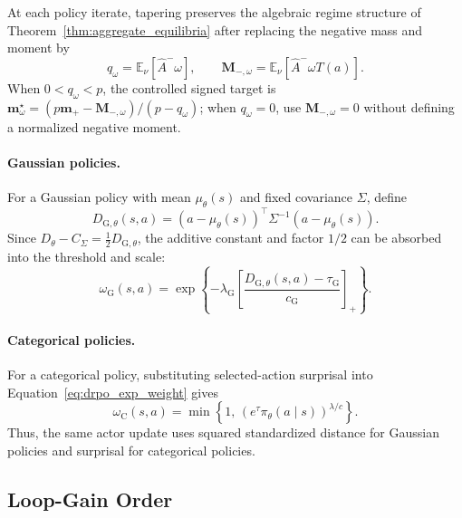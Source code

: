 At each policy iterate, tapering preserves the algebraic regime structure of
Theorem~\ref{thm:aggregate_equilibria} after replacing the negative mass and
moment by
\[
q_\omega=\mathbb E_\nu[\widehat A^-\omega],
\qquad
\mathbf M_{-,\omega}=\mathbb E_\nu[\widehat A^-\omega T(a)].
\]
When \(0<q_\omega<p\), the controlled signed target is
\(\mathbf m_\omega^\star=(p\mathbf m_+-\mathbf M_{-,\omega})/(p-q_\omega)\);
when \(q_\omega=0\), use \(\mathbf M_{-,\omega}=0\) without defining a
normalized negative moment.

\paragraph{Gaussian policies.}
For a Gaussian policy with mean \(\mu_\theta(s)\) and fixed covariance
\(\Sigma\), define
\begin{equation}
    D_{\mathrm G,\theta}(s,a)
    =
    (a-\mu_\theta(s))^\top
    \Sigma^{-1}
    (a-\mu_\theta(s)).
    \label{eq:gaussian_squared_distance}
\end{equation}
Since \(D_\theta-C_\Sigma=\frac12D_{\mathrm G,\theta}\), the additive
constant and factor \(1/2\) can be absorbed into the threshold and scale:
\begin{equation}
    \omega_{\mathrm G}(s,a)
    =
    \exp
    \left\{
        -\lambda_{\mathrm G}
        \left[
            \frac{D_{\mathrm G,\theta}(s,a)-\tau_{\mathrm G}}
                 {c_{\mathrm G}}
        \right]_{+}
    \right\}.
    \label{eq:drpo_gaussian_weight}
\end{equation}

\paragraph{Categorical policies.}
For a categorical policy, substituting selected-action surprisal into
Equation~\eqref{eq:drpo_exp_weight} gives
\begin{equation}
    \omega_{\mathrm C}(s,a)
    =
    \min
    \left\{
        1,\,
        \left(e^{\tau}\pi_\theta(a\mid s)\right)^{\lambda/c}
    \right\}.
    \label{eq:drpo_categorical_weight}
\end{equation}
Thus, the same actor update uses squared standardized distance for Gaussian
policies and surprisal for categorical policies.

\subsection{Loop-Gain Order}
\label{subsec:min_order_control}

